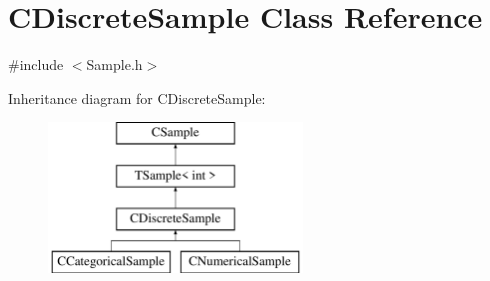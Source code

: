 \hypertarget{class_c_discrete_sample}{\section{C\-Discrete\-Sample Class Reference}
\label{class_c_discrete_sample}
}


{\ttfamily \#include $<$Sample.\-h$>$}

Inheritance diagram for C\-Discrete\-Sample\-:\begin{figure}[H]
\begin{center}
\leavevmode
\includegraphics[height=4.000000cm]{class_c_discrete_sample}
\end{center}
\end{figure}
